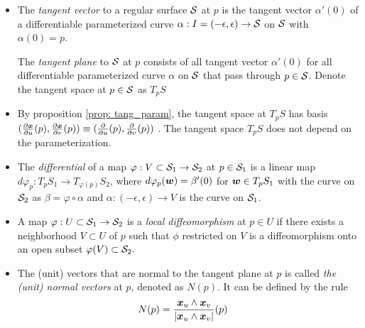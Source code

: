 \documentclass[11pt]{article}
\begin{document}
\begin{itemize}
\item  \begin{definition}
The \emph{tangent vector} to a regular surface ${\mathcal S}$ at $p$ is the tangent vector $\alpha'(0)$ of a differentiable parameterized curve $\alpha: I = (-\epsilon, \epsilon)\rightarrow {\mathcal S}$ on ${\mathcal S}$ with $\alpha(0)  = p$. 

 The \emph{tangent plane} to ${\mathcal S}$ at $p$ consists of all tangent vector $\alpha'(0)$ for all differentiable parameterized curve $\alpha$ on ${\mathcal S}$ that pass through $p\in {\mathcal S}$. Denote the tangent space at $p\in {\mathcal S}$ as $T_{p}S$
\end{definition} 

\item By proposition \ref{prop: tang_param}, the tangent space at $T_{p}S$ has basis $(\frac{\partial \boldsymbol{x}}{ \partial u}(p), \frac{\partial \boldsymbol{x}}{ \partial v}(p)) \equiv (\frac{\partial }{ \partial u}(p), \frac{\partial }{ \partial v}(p))$ \citep{amari2007methods}. The tangent space $T_{p}S$ does not depend on the parameterization. 




\item The \emph{differential} of a map $\varphi: V\subset {\mathcal S}_{1} \rightarrow {\mathcal S}_{2}$ at $p\in {\mathcal S}_{1}$ is a linear map $d\varphi_{p}: T_{p}S_{1} \rightarrow T_{\varphi(p)}S_{2}$, where $d\varphi_{p}(\boldsymbol{w}) = \beta'(0)$ for $\boldsymbol{w}\in T_{p}S_{1}$ with the curve on ${\mathcal S}_{2}$ as $\beta = \varphi\circ \alpha$ and $\alpha: (-\epsilon, \epsilon) \rightarrow V$ is the curve on ${\mathcal S}_{1}$. 



\item  \begin{definition}
 A map $\varphi: U\subset {\mathcal S}_{1} \rightarrow {\mathcal S}_{2}$ is a \emph{local diffeomorphism} at $p\in U$ if there exists a neighborhood $V\subset U$ of $p$ such that $\phi$ restricted on $V$ is a diffeomorphism onto an open subset $\varphi(V)\subset {\mathcal S}_{2}. $ 
 \end{definition} 

\item The (unit)  vectors that are normal to the tangent plane at $p$ is called \emph{the (unit) normal vectors} at $p$, denoted as $N(p)$.  It can be defined by the rule
\begin{align*}
N(p) &= \frac{\boldsymbol{x}_{u} \wedge \boldsymbol{x}_{v}}{\left\lvert \boldsymbol{x}_{u} \wedge \boldsymbol{x}_{v} \right\rvert}(p)
\end{align*}



\end{itemize}
\end{document}
